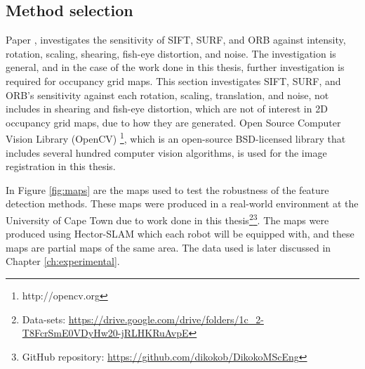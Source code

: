 


\subsection{Method selection}
\label{sub:sec:method}

Paper \cite{Karami2015}, investigates the sensitivity of SIFT, SURF, and ORB against intensity, rotation, scaling, shearing, fish-eye distortion, and noise. The investigation is general, and in the case of the work done in this thesis, further investigation is required for occupancy grid maps. This section investigates SIFT, SURF, and ORB's sensitivity against each rotation, scaling, translation, and noise, not includes in shearing and fish-eye distortion, which are not of interest in 2D occupancy grid maps, due to how they are generated. Open Source Computer Vision Library (OpenCV) \footnote{http://opencv.org}, which is an open-source BSD-licensed library that includes several hundred computer vision algorithms, is used for the image registration in this thesis.

In Figure \ref{fig:maps} are the maps used to test the robustness of the feature detection methods. These maps were produced in a real-world environment at the University of Cape Town due to work done in this thesis\footnote{Data-sets: \url{https://drive.google.com/drive/folders/1c\_2-T8FcrSmE0VDyHw20-jRLHKRuAvpE}}\footnote{GitHub repository: \url{https://github.com/dikokob/DikokoMScEng}}. The maps were produced using Hector-SLAM which each robot will be equipped with, and these maps are partial maps of the same area. The data used is later discussed in Chapter \ref{ch:experimental}.

